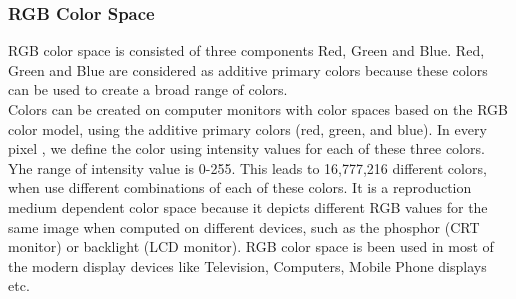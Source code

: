 \subsubsection*{RGB Color Space}
RGB color space is consisted of three components Red, Green and Blue. Red, Green and Blue are considered as additive primary colors because these colors can be used to create a broad range of colors.\\ 
Colors can be created on computer monitors with color spaces based on the RGB color model, using the additive primary colors (red, green, and blue). In every pixel , we define the color using intensity values for each of these three colors. Yhe range of intensity value is 0-255. This leads to 16,777,216 different colors, when use different combinations of each of these colors. It is a reproduction medium dependent color space because it depicts different RGB values for the same image when computed on different devices, such as the phosphor (CRT monitor) or backlight (LCD monitor). RGB color space is been used in most of the modern display devices like Television, Computers, Mobile Phone displays etc.\\
